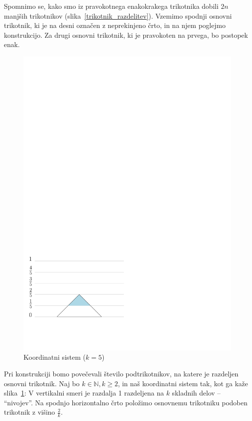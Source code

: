\documentclass[a4paper, 12pt]{article}
\begin{document}
Spomnimo se, kako smo iz pravokotnega enakokrakega trikotnika dobili $ 2n $ manjših trikotnikov (slika~\ref{trikotnik_razdelitev}). Vzemimo spodnji osnovni trikotnik, ki je na desni označen z neprekinjeno črto, in na njem poglejmo konstrukcijo. Za drugi osnovni trikotnik, ki je pravokoten na prvega, bo postopek enak.

\begin{figure}
    \includegraphics[width=0.9\linewidth]{ipe_slike/k_5.pdf}
    \caption{Koordinatni sistem ($ k = 5 $)}
    \label{sistem5}
\end{figure}

Pri konstrukciji bomo povečevali število podtrikotnikov, na katere je razdeljen osnovni trikotnik. Naj bo $ k \in \mathbb{N}, k \geq 2 $, in naš koordinatni sistem tak, kot ga kaže slika~\ref{sistem5}: V vertikalni smeri je razdalja 1 razdeljena na $ k $ skladnih delov -- ``nivojev''. Na spodnjo horizontalno črto položimo osnovnemu trikotniku podoben trikotnik z višino $ \frac{2}{k} $.
\end{document}
